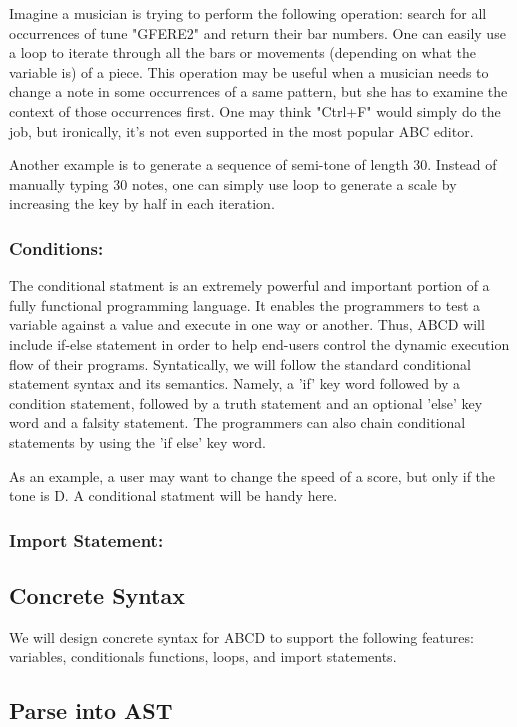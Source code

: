	Imagine a musician is trying to perform the following operation: search for all occurrences of tune "GFERE2" and return their bar numbers. One can easily use a loop to iterate through all the bars or movements (depending on what the variable is) of a piece. This operation may be useful when a musician needs to change a note in some occurrences of a same pattern, but she has to examine the context of those occurrences first. One may think "Ctrl+F" would simply do the job, but ironically, it's not even supported in the most popular ABC editor\cite{SlashdotMedia17}.  

	Another example is to generate a sequence of semi-tone of length 30. Instead of manually typing 30 notes, one can simply use loop to generate a scale by increasing the key by half in each iteration.

	\subsubsection{Conditions:}
		The conditional statment is an extremely powerful and important portion of a fully functional programming language. It enables the programmers to test a variable against a value and execute in one way or another. Thus, ABCD will include if-else statement in order to help end-users control the dynamic execution flow of their programs. Syntatically, we will follow the standard conditional statement syntax and its semantics. Namely, a 'if' key word followed by a condition statement, followed by a truth statement and an optional 'else' key word and a falsity statement. The programmers can also chain conditional statements by using the 'if else' key word.

		As an example, a user may want to change the speed of a score, but only if the tone is D. A conditional statment will be handy here.
	\subsubsection{Import Statement:}
\subsection{Concrete Syntax}
We will design concrete syntax for ABCD to support the following features: variables, conditionals functions, loops, and import statements.
\subsection{Parse into AST}

